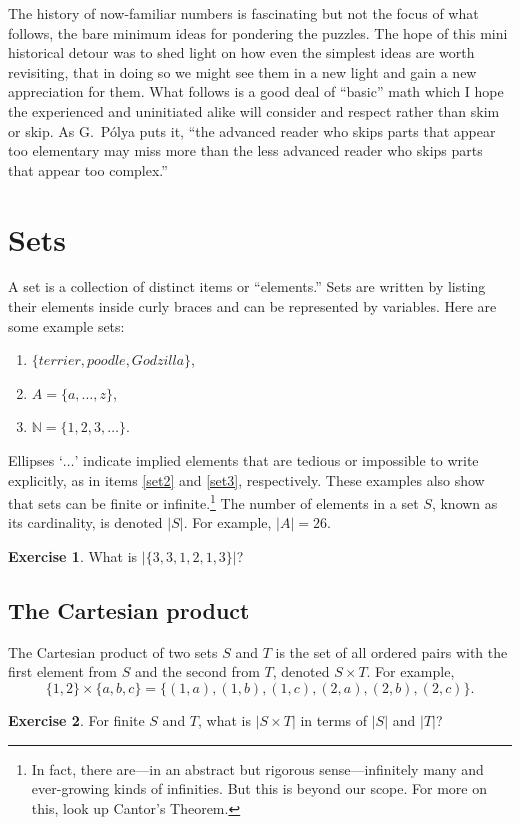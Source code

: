 \documentclass{book}
\theoremstyle{definition}
\newtheorem{exercise}{Exercise}[chapter]
\theoremstyle{colonstylebf}
\newcommand{\set}[1]{\{#1\}}
\newcommand{\N}{\mathbb{N}}
\begin{document}
The history of now-familiar numbers is fascinating but not the focus of what follows, the bare minimum ideas for pondering the puzzles. The hope of this mini historical detour was to shed light on how even the simplest ideas are worth revisiting, that in doing so we might see them in a new light and gain a new appreciation for them. What follows is a good deal of ``basic'' math which I hope the experienced and uninitiated alike will consider and respect rather than skim or skip. As G.\ P\'olya puts it, ``the advanced reader who skips parts that appear too elementary may miss more than the less advanced reader who skips parts that appear too complex.''

\section{Sets}
A set is a collection of distinct items or ``elements.'' Sets are written by listing their elements inside curly braces and can be represented by variables. Here are some example sets:
\begin{enumerate}[label = (\arabic*)]
\item $\set{terrier, poodle, Godzilla}$,
\item\label{set2} $A = \set{a, \dots, z}$,
\item\label{set3} $\N = \set{1, 2, 3, \dots}$.
\end{enumerate}
Ellipses `{$\dots$}' indicate implied elements that are tedious or impossible to write explicitly, as in items \ref{set2} and \ref{set3}, respectively. These examples also show that sets can be finite or infinite.\footnote{In fact, there are---in an abstract but rigorous sense---infinitely many and ever-growing kinds of infinities. But this is beyond our scope. For more on this, look up Cantor's Theorem.} The number of elements in a set $S$, known as its cardinality, is denoted $|S|$. For example, $|A| = 26$.

\begin{exercise}\label{distinct}
What is $|\{3, 3, 1, 2, 1, 3\}|$?
\end{exercise}

\subsection{The Cartesian product}
The Cartesian product of two sets $S$ and $T$ is the set of all ordered pairs with the first element from $S$ and the second from $T$, denoted $S \times T$.
For example, \[\set{1, 2} \times \set{a, b, c} = \set{(1, a), (1, b), (1, c), (2, a), (2, b), (2, c)}.\]
\begin{exercise}\label{cartesianques}
For finite $S$ and $T$, what is $|S \times T|$ in terms of $|S|$ and $|T|$?
\end{exercise}
\end{document}
